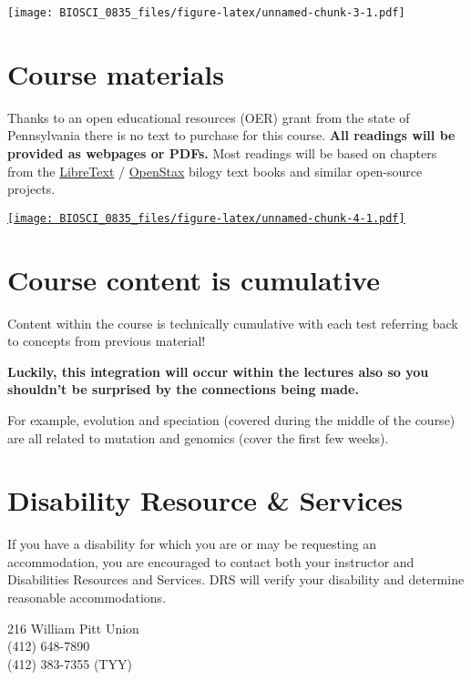 \documentclass[
]{book}
\begin{document}
\texttt{[image: BIOSCI\_0835\_files/figure-latex/unnamed-chunk-3-1.pdf]}

\hypertarget{course-materials}{%
\chapter{Course materials}\label{course-materials}}

Thanks to an open educational resources (OER) grant from the state of Pennsylvania there is no text to purchase for this course. \textbf{All readings will be provided as webpages or PDFs.} Most readings will be based on chapters from the \href{https://bio.libretexts.org/Bookshelves/Introductory_and_General_Biology/Book\%3A_General_Biology_(OpenStax)}{LibreText} / \href{https://openstax.org/details/books/biology-2e}{OpenStax} bilogy text books and similar open-source projects.

\href{https://upload.wikimedia.org/wikipedia/en/c/c6/Openstax_logo.png}{\texttt{[image: BIOSCI\_0835\_files/figure-latex/unnamed-chunk-4-1.pdf]}}

\hypertarget{course-content-is-cumulative}{%
\chapter{Course content is cumulative}\label{course-content-is-cumulative}}

Content within the course is technically cumulative with each test referring back to concepts from previous material!

\textbf{Luckily, this integration will occur within the lectures also so you shouldn't be surprised by the connections being made.}

For example, evolution and speciation (covered during the middle of the course) are all related to mutation and genomics (cover the first few weeks).

\hypertarget{DRS}{%
\chapter{Disability Resource \& Services}\label{DRS}}

If you have a disability for which you are or may be requesting an accommodation, you are encouraged to contact both your instructor and Disabilities Resources and Services. DRS will verify your disability and determine reasonable accommodations.

216 William Pitt Union\\
(412) 648-7890\\
(412) 383-7355 (TYY)
\end{document}

